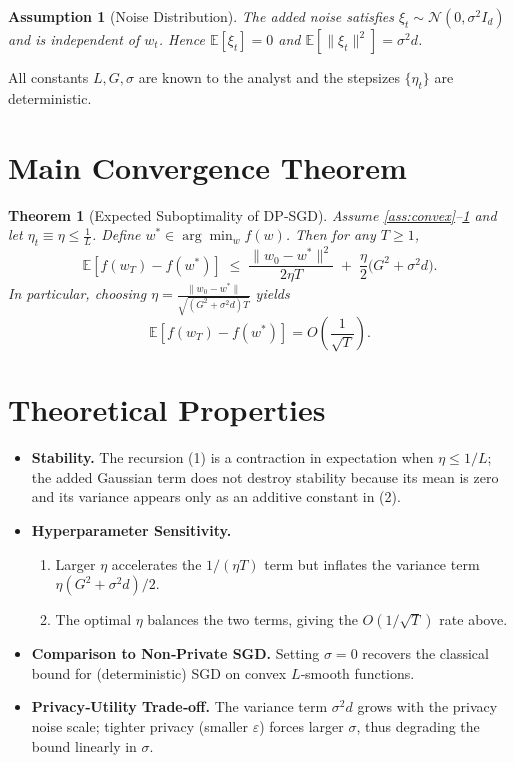 \documentclass{article}
\newtheorem{theorem}{Theorem}
\newtheorem{assumption}{Assumption}
\newcommand{\E}{\mathbb{E}}
\begin{document}
\begin{assumption}[Noise Distribution]\label{ass:noise}
The added noise satisfies $\xi_t\sim\mathcal N(0,\sigma^{2}I_d)$ and is independent of $w_t$.
Hence $\E[\xi_t]=0$ and $\E[\|\xi_t\|^{2}]=\sigma^{2}d$.
\end{assumption}

All constants $L,G,\sigma$ are known to the analyst and the stepsizes $\{\eta_t\}$ are deterministic.

\section*{Main Convergence Theorem}
\begin{theorem}[Expected Suboptimality of DP‑SGD]\label{thm:conv}
Assume \ref{ass:convex}–\ref{ass:noise} and let $\eta_t\equiv\eta\le \frac{1}{L}$.  
Define $w^{*}\in\arg\min_{w}f(w)$. Then for any $T\ge1$,
\[
\E\!\left[f(w_T)-f(w^{*})\right]\;\le\;
\frac{\|w_0-w^{*}\|^{2}}{2\eta T}
\;+\;\frac{\eta}{2}\bigl(G^{2}+\sigma^{2}d\bigr).
\tag{2}
\]
In particular, choosing $\eta=\frac{\|w_0-w^{*}\|}{\sqrt{(G^{2}+\sigma^{2}d)T}}$ yields
\[
\E\!\left[f(w_T)-f(w^{*})\right]=
O\!\left(\frac{1}{\sqrt{T}}\right).
\]
\end{theorem}

\section*{Theoretical Properties}
\begin{itemize}
\item \textbf{Stability.} The recursion (1) is a contraction in expectation when $\eta\le 1/L$; the added Gaussian term does not destroy stability because its mean is zero and its variance appears only as an additive constant in (2).
\item \textbf{Hyperparameter Sensitivity.}
    \begin{enumerate}
        \item Larger $\eta$ accelerates the $1/(\eta T)$ term but inflates the variance term $\eta(G^{2}+\sigma^{2}d)/2$.
        \item The optimal $\eta$ balances the two terms, giving the $O(1/\sqrt{T})$ rate above.
    \end{enumerate}
\item \textbf{Comparison to Non‑Private SGD.}  Setting $\sigma=0$ recovers the classical bound for (deterministic) SGD on convex $L$‑smooth functions.
\item \textbf{Privacy‑Utility Trade‑off.}  The variance term $\sigma^{2}d$ grows with the privacy noise scale; tighter privacy (smaller $\varepsilon$) forces larger $\sigma$, thus degrading the bound linearly in $\sigma$.
\end{itemize}
\end{document}
